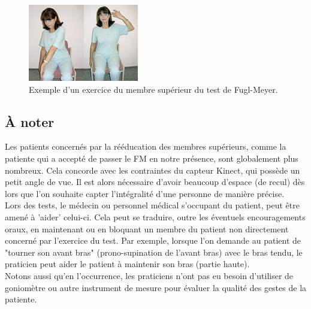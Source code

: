 \begin{figure}[h!]
\centering
\includegraphics[width=0.5\linewidth]{images/fuglmeyer_example}
\caption{Exemple d'un exercice du membre supérieur du test de Fugl-Meyer.}
\end{figure}

        \subsection{À noter}
Les patients concernés par la rééducation des membres supérieurs, comme la patiente qui a accepté de passer 
le FM en notre présence, sont globalement plus nombreux. Cela concorde avec les contraintes du capteur Kinect, 
qui possède un petit angle de vue. Il est alors nécessaire d'avoir beaucoup d'espace (de recul) dès lors que 
l'on souhaite capter l'intégralité d'une personne de manière précise. \\
Lors des tests, le médecin ou personnel médical s'occupant du patient, peut être amené à 'aider' celui-ci.
Cela peut se traduire, outre les éventuels encouragements oraux, en maintenant ou en bloquant un membre du patient
non directement concerné par l'exercice du test. Par exemple, lorsque l'on demande au patient de "tourner son avant 
bras" (prono-supination de l'avant bras) avec le bras tendu, le praticien peut aider le patient à maintenir son bras
(partie haute).\\
Notons aussi qu'en l'occurrence, les praticiens n'ont pas eu besoin d'utiliser de goniomètre ou autre instrument de 
mesure pour évaluer la qualité des gestes de la patiente.
    
